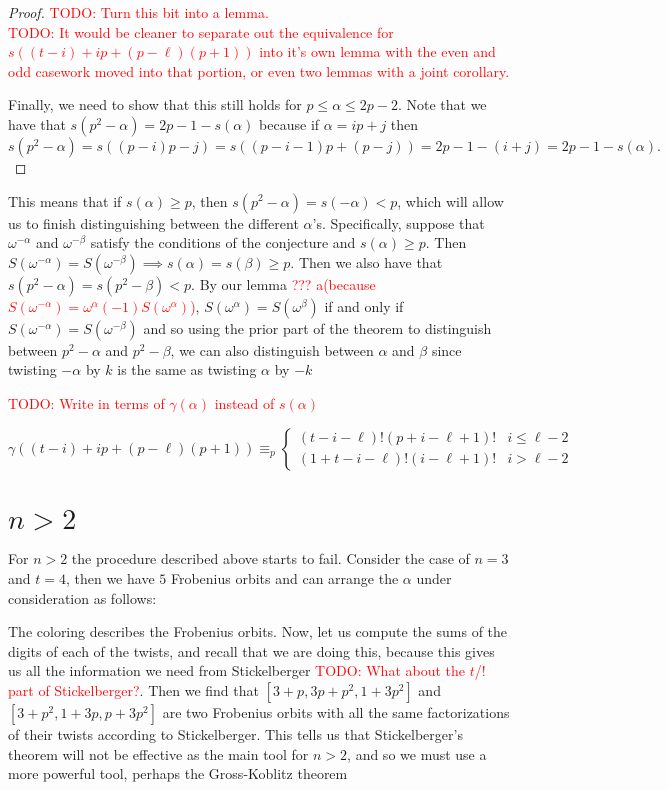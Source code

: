 \documentclass[12pt]{article}
\theoremstyle{customtheorem}%
\theoremstyle{remark}
\theoremstyle{definition}
\numberwithin{equation}{section}
\numberwithin{theorem}{section}
\begin{document}
\begin{proof}
\textcolor{red}{TODO: Turn this bit into a lemma.}
\\
\textcolor{red}{TODO: It would be cleaner to separate out the equivalence for $s((t-i)+ip+(p-\ell)(p+1))$ into it's own lemma with the even and odd casework moved into that portion, or even two lemmas with a joint corollary.}


Finally, we need to show that this still holds for $p \leq \alpha \leq 2p - 2$. 
Note that we have that $s(p^2 - \alpha) = 2p-1  - s(\alpha)$ because if $\alpha = ip+j$ then \[s(p^2 -\alpha) = s((p-i)p -j) = s((p -i - 1)p + (p-j) )= 2p-1 - (i+j) = 2p - 1 - s(\alpha).\]
\end{proof}

This means that if $s(\alpha) \geq p$, then $s(p^2 - \alpha) = s(-\alpha) < p$, which will allow us to finish distinguishing between the different $\alpha$'s. 
Specifically, suppose that $\omega^{-\alpha}$ and $\omega^{-\beta}$ satisfy the conditions of the conjecture and $s(\alpha) \geq p$. 
Then $S(\omega^{-\alpha}) = S(\omega^{-\beta}) \implies s(\alpha) = s(\beta) \geq p$. 
Then we also have that $s(p^2 - \alpha) = s(p^2 - \beta) < p$. 
By our lemma \textcolor{red}{??? a(because $S(\omega^{-\alpha}) = \omega^{\alpha}(-1)S(\omega^{\alpha})$)}, $S(\omega^\alpha) = S(\omega^\beta)$ if and only if $S(\omega^{-\alpha}) = S(\omega^{-\beta})$ and so using the prior part of the theorem to distinguish between $p^2 - \alpha$ and $p^2 - \beta$, we can also distinguish between $\alpha$ and $\beta$ since twisting $-\alpha$ by $k$ is the same as twisting $\alpha$ by $-k$ 

\textcolor{red}{TODO: Write in terms of $\gamma(\alpha)$ instead of $s(\alpha)$}

\[ \gamma((t-i)+ip + (p - \ell)(p+1)) \equiv_p \begin{cases} (t-i-\ell)!(p+i-\ell+1)! & i \leq \ell -2 \\ (1+t-i-\ell)!(i-\ell+1)!& i > \ell -2 \end{cases}\]

\section{$n>2$}

For $n > 2$ the procedure described above starts to fail. 
Consider the case of $n = 3$ and $t = 4$, then we have $5$ Frobenius orbits and can arrange the $\alpha$ under consideration as follows:

The coloring describes the Frobenius orbits. 
Now, let us compute the sums of the digits of each of the twists, and recall that we are doing this, because this gives us all the information we need from Stickelberger \textcolor{red}{TODO: What about the $t$/$!$ part of Stickelberger?}. 
Then we find that $[3+p,3p+p^2,1+3p^2]$ and $[3+p^2, 1+3p, p+3p^2]$ are two Frobenius orbits with all the same factorizations of their twists according to Stickelberger. 
This tells us that Stickelberger's theorem will not be effective as the main tool for $n > 2$, and so we must use a more powerful tool, perhaps the Gross-Koblitz theorem

%
%
\end{document}
